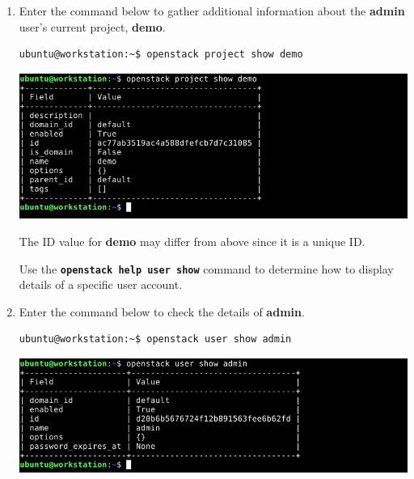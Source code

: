 \documentclass[letterpaper, 12pt]{article}
\begin{document}
\begin{enumerate}
    \item Enter the command below to gather additional information about the \textbf{admin} user's current project,
    \textbf{demo}.
\begin{lstlisting}
ubuntu@workstation:~$ openstack project show demo
\end{lstlisting}

    \begin{center}
        \includegraphics[width=\linewidth]{images/part2/step6.png}
    \end{center}

    \begin{notebox}
        The ID value for \textbf{demo} may differ from above since it is a unique ID.
    \end{notebox}

    \begin{tipbox}{}
        Use the \textbf{\texttt{openstack help user show}} command to determine how to display details of a specific
        user account.
    \end{tipbox}

    \item Enter the command below to check the details of \textbf{admin}.
\begin{lstlisting}
ubuntu@workstation:~$ openstack user show admin
\end{lstlisting}

    \begin{center}
        \includegraphics[width=\linewidth]{images/part2/step7.png}
    \end{center}


\end{enumerate}
\end{document}
